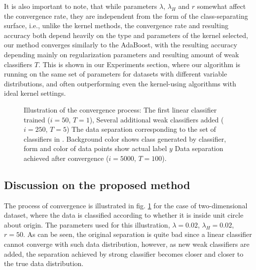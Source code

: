\documentclass[10pt,twocolumn, a4paper]{article}
\begin{document}
It is also important to note, that while parameters $\lambda$, $\lambda_H$ and $r$ somewhat affect the convergence rate, they are independent from the form of the class-separating surface, i.e., unlike the kernel methods, the convergence rate and resulting accuracy both depend heavily on the type and parameters of the kernel selected, our method converges similarly to the AdaBoost, with the resulting accuracy depending mainly on regularization parameters and resulting amount of weak classifiers $T$. This is shown in our Experiments section, where our algorithm is running on the same set of parameters for datasets with different variable distributions, and often outperforming even the kernel-using algorithms with ideal kernel settings.
\begin{figure*}[t]
    \centering

 


    \caption{Illustration of the convergence process: \protect {} The first linear classifier trained ($i=50$, $T=1$), \protect{} Several additional weak classifiers added ($i=250$, $T=5$) \protect {} The data separation corresponding to the set of classifiers in \protect {}. Background color shows class generated by classifier, form and color of data points show actual label $y$ \protect {} Data separation achieved after convergence ($i=5000$, $T=100$). }
    \label{Convergence}
\end{figure*}


\subsection{Discussion on the proposed method}
The process of convergence is illustrated in fig. \ref{Convergence} for the case of two-dimensional dataset, where the data is classified according to whether it is inside unit circle about origin. The parameters used for this illustration, $\lambda=0.02$, $\lambda_H=0.02$, $r=50$.  As can be seen, the original separation is quite bad since a linear classifier cannot converge with such data distribution, however, as new weak classifiers are added, the separation achieved by strong classifier becomes closer and closer to the true data distribution. 
\end{document}
